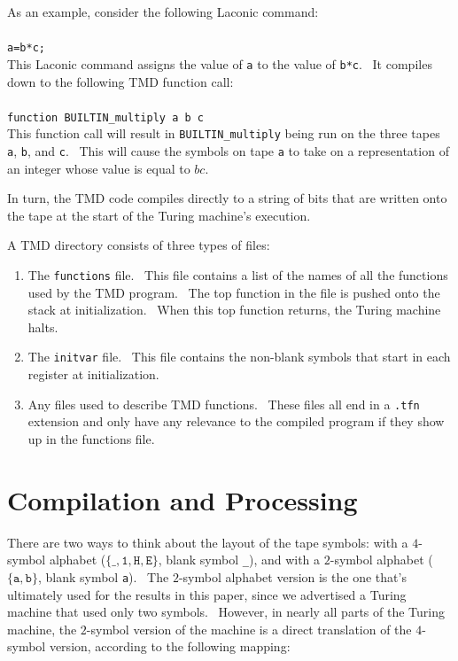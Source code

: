 \documentclass[11pt]{article}
\begin{document}
As an example, consider the following Laconic command: \\ \\
\texttt{a=b*c;} \\

This Laconic command assigns the value of \texttt{a} to the value of \texttt{b*c}. \ It compiles down to the following TMD function call: \\ \\
\texttt{function BUILTIN\_multiply a b c} \\

This function call will result in \texttt{BUILTIN\_multiply} being run on the three tapes \texttt{a}, \texttt{b}, and \texttt{c}. \ This will cause the symbols on tape \texttt{a} to take on a representation of an integer whose value is equal to $bc$.

In turn, the TMD code compiles directly to a string of bits that are written onto the tape at the start of the Turing machine's execution.

A TMD directory consists of three types of files:

\begin{enumerate}
\item The \texttt{functions} file. \ This file contains a list of the names of all the functions used by the TMD program. \ The top function in the file is pushed onto the stack at initialization. \ When this top function returns, the Turing machine halts.
\item The \texttt{initvar} file. \ This file contains the non-blank symbols that start in each register at initialization.
\item Any files used to describe TMD functions. \ These files all end in a \texttt{.tfn} extension and only have any relevance to the compiled program if they show up in the functions file.
\end{enumerate}

\section{Compilation and Processing}
\label{sec:compandproc}

There are two ways to think about the layout of the tape symbols: with a $4$-symbol alphabet ($\{\texttt{\_}, \texttt{1}, \texttt{H}, \texttt{E}\}$, blank symbol \texttt{\_}), and with a $2$-symbol alphabet ($\{\texttt{a}, \texttt{b}\}$, blank symbol \texttt{a}). \ The $2$-symbol alphabet version is the one that's ultimately used for the results in this paper, since we advertised a Turing machine that used only two symbols. \ However, in nearly all parts of the Turing machine, the $2$-symbol version of the machine is a direct translation of the $4$-symbol version, according to the following mapping:
\end{document}
